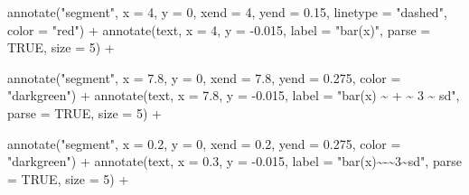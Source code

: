 \documentclass[
]{book}
\newenvironment{Shaded}{\begin{snugshade}}{\end{snugshade}}
\newcommand{\AttributeTok}[1]{\textcolor[rgb]{0.77,0.63,0.00}{#1}}
\newcommand{\ConstantTok}[1]{\textcolor[rgb]{0.00,0.00,0.00}{#1}}
\newcommand{\DecValTok}[1]{\textcolor[rgb]{0.00,0.00,0.81}{#1}}
\newcommand{\FloatTok}[1]{\textcolor[rgb]{0.00,0.00,0.81}{#1}}
\newcommand{\FunctionTok}[1]{\textcolor[rgb]{0.00,0.00,0.00}{#1}}
\newcommand{\NormalTok}[1]{#1}
\newcommand{\SpecialCharTok}[1]{\textcolor[rgb]{0.00,0.00,0.00}{#1}}
\newcommand{\StringTok}[1]{\textcolor[rgb]{0.31,0.60,0.02}{#1}}
\begin{document}
\begin{Shaded}
\begin{Highlighting}[]
  \FunctionTok{annotate}\NormalTok{(}\StringTok{"segment"}\NormalTok{, }\AttributeTok{x =} \DecValTok{4}\NormalTok{, }\AttributeTok{y =} \DecValTok{0}\NormalTok{, }\AttributeTok{xend =} \DecValTok{4}\NormalTok{, }\AttributeTok{yend =} \FloatTok{0.15}\NormalTok{, }\AttributeTok{linetype =} \StringTok{"dashed"}\NormalTok{, }\AttributeTok{color =} \StringTok{"red"}\NormalTok{) }\SpecialCharTok{+} 
  \FunctionTok{annotate}\NormalTok{(}\StringTok{\textquotesingle{}text\textquotesingle{}}\NormalTok{, }\AttributeTok{x =} \DecValTok{4}\NormalTok{, }\AttributeTok{y =} \SpecialCharTok{{-}}\FloatTok{0.015}\NormalTok{, }\AttributeTok{label =} \StringTok{"bar(x)"}\NormalTok{, }\AttributeTok{parse =} \ConstantTok{TRUE}\NormalTok{, }\AttributeTok{size =} \DecValTok{5}\NormalTok{) }\SpecialCharTok{+}
  
  \FunctionTok{annotate}\NormalTok{(}\StringTok{"segment"}\NormalTok{, }\AttributeTok{x =} \FloatTok{7.8}\NormalTok{, }\AttributeTok{y =} \DecValTok{0}\NormalTok{, }\AttributeTok{xend =} \FloatTok{7.8}\NormalTok{, }\AttributeTok{yend =} \FloatTok{0.275}\NormalTok{, }\AttributeTok{color =} \StringTok{"darkgreen"}\NormalTok{) }\SpecialCharTok{+} 
  \FunctionTok{annotate}\NormalTok{(}\StringTok{\textquotesingle{}text\textquotesingle{}}\NormalTok{, }\AttributeTok{x =} \FloatTok{7.8}\NormalTok{, }\AttributeTok{y =} \SpecialCharTok{{-}}\FloatTok{0.015}\NormalTok{, }\AttributeTok{label =} \StringTok{"bar(x) \textasciitilde{} + \textasciitilde{} 3 \textasciitilde{} sd"}\NormalTok{, }\AttributeTok{parse =} \ConstantTok{TRUE}\NormalTok{, }\AttributeTok{size =} \DecValTok{5}\NormalTok{) }\SpecialCharTok{+}
  
  \FunctionTok{annotate}\NormalTok{(}\StringTok{"segment"}\NormalTok{, }\AttributeTok{x =} \FloatTok{0.2}\NormalTok{, }\AttributeTok{y =} \DecValTok{0}\NormalTok{, }\AttributeTok{xend =} \FloatTok{0.2}\NormalTok{, }\AttributeTok{yend =} \FloatTok{0.275}\NormalTok{, }\AttributeTok{color =} \StringTok{"darkgreen"}\NormalTok{) }\SpecialCharTok{+} 
  \FunctionTok{annotate}\NormalTok{(}\StringTok{\textquotesingle{}text\textquotesingle{}}\NormalTok{, }\AttributeTok{x =} \FloatTok{0.3}\NormalTok{, }\AttributeTok{y =} \SpecialCharTok{{-}}\FloatTok{0.015}\NormalTok{, }\AttributeTok{label =} \StringTok{"bar(x)\textasciitilde{}{-}\textasciitilde{}3\textasciitilde{}sd"}\NormalTok{, }\AttributeTok{parse =} \ConstantTok{TRUE}\NormalTok{, }\AttributeTok{size =} \DecValTok{5}\NormalTok{) }\SpecialCharTok{+}
  

\end{Highlighting}
\end{Shaded}
\end{document}
